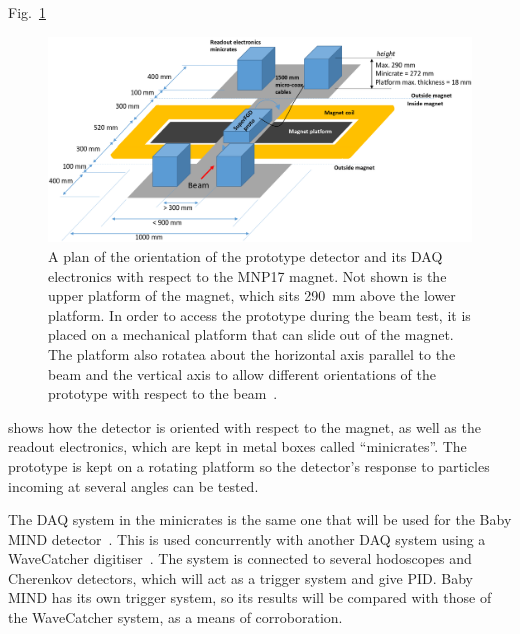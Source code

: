 \documentclass[aps,pra,12pt,notitlepage,tightenlines]{revtex4-1}
\begin{document}
Fig.\ \ref{fig:plat}
\begin{figure}
 \includegraphics[scale=0.4]{platform2}
 \caption{A plan of the orientation of the prototype detector and its DAQ electronics with respect to the MNP17 magnet. Not shown is the upper platform of the magnet, which sits 290~mm above the lower platform. In order to access the prototype during the beam test, it is placed on a mechanical platform that can slide out of the magnet. The platform also rotatea about the horizontal axis parallel to the beam and the vertical axis to allow different orientations of the prototype with respect to the beam~\cite{Cadoux2018}.}
 \label{fig:plat}
\end{figure}
shows how the detector is oriented with respect to the magnet, as well as the readout electronics, which are kept in metal boxes called ``minicrates''. The prototype is kept on a rotating platform so the detector's response to particles incoming at several angles can be tested.

The DAQ system in the minicrates is the same one that will be used for the Baby MIND detector~\cite{Antonova2017}. This is used concurrently with another DAQ system using a WaveCatcher digitiser~\cite{CAEN}. The system is connected to several hodoscopes and Cherenkov detectors, which will act as a trigger system and give PID. Baby MIND has its own trigger system, so its results will be compared with those of the WaveCatcher system, as a means of corroboration.
\end{document}

